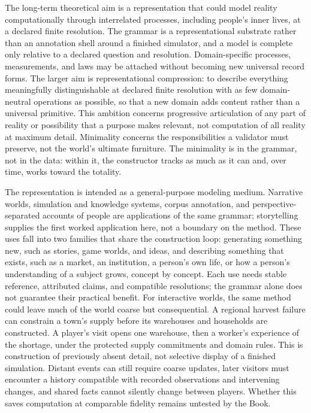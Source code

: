 \documentclass[11pt,a4paper]{article}
\begin{document}
The long-term theoretical aim is a representation that could model reality
computationally through interrelated processes, including people's inner lives,
at a declared finite resolution. The grammar is a representational substrate
rather than an annotation shell around a finished simulator, and a model is
complete only relative to a declared question and resolution. Domain-specific
processes, measurements, and laws may be attached without becoming new universal
record forms. The larger aim is representational compression: to describe
everything meaningfully distinguishable at declared finite resolution with as
few domain-neutral operations as possible, so that a new domain adds content
rather than a universal primitive. This ambition concerns progressive
articulation of any part of reality or possibility that a purpose makes
relevant, not computation of all reality at maximum detail. Minimality concerns
the responsibilities a validator must preserve, not the world's ultimate
furniture. The minimality is in the grammar, not in the data: within it, the
constructor tracks as much as it can and, over time, works toward the totality.

The representation is intended as a general-purpose modeling medium. Narrative worlds,
simulation and knowledge systems, corpus annotation, and perspective-separated
accounts of people are applications of the same grammar; storytelling supplies
the first worked application here, not a boundary on the method. These uses fall
into two families that share the construction loop: generating something new,
such as stories, game worlds, and ideas, and describing something that exists,
such as a market, an institution, a person's own life, or how a person's
understanding of a subject grows, concept by concept. Each use needs
stable reference, attributed claims, and compatible resolutions; the grammar
alone does not guarantee their practical benefit. For interactive worlds, the
same method could leave much of the world coarse but consequential. A
regional harvest failure can constrain a town's supply before its warehouses and
households are constructed. A player's visit opens one warehouse, then a
worker's experience of the shortage, under the protected supply commitments and
domain rules. This is construction of previously absent detail, not selective
display of a finished simulation. Distant events can still require coarse
updates, later visitors must encounter a history compatible with recorded
observations and intervening changes, and shared facts cannot silently change
between players. Whether this saves computation at comparable fidelity
remains untested by the Book.
\end{document}
